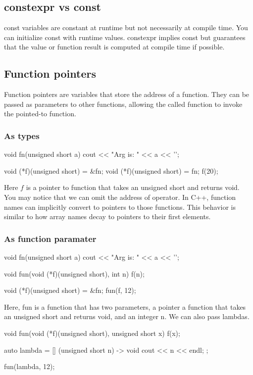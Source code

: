 \documentclass{report}
\begin{document}
   \bigbreak \noindent 
   \subsection{constexpr vs const}
   \bigbreak \noindent 
   const variables are constant at runtime but not necessarily at compile time. You can initialize const with runtime values.
   \bigbreak \noindent 
    constexpr implies const but guarantees that the value or function result is computed at compile time if possible.


    \pagebreak 
    \bigbreak \noindent 
    \subsection{Function pointers}
    \bigbreak \noindent 
    Function pointers are variables that store the address of a function. They can be passed as parameters to other functions, allowing the called function to invoke the pointed-to function.
    \bigbreak \noindent 
    \subsubsection{As types}
    \bigbreak \noindent 
    \begin{cppcode}
        void fn(unsigned short a) {
            cout << "Arg is: " << a << '\n';
        }

        void (*f)(unsigned short) = &fn;
        void (*f)(unsigned short) = fn;
        f(20);
    \end{cppcode}
    Here $f$ is a pointer to function that takes an unsigned short and returns void. You may notice that we can omit the address of operator. In C++, function names can implicitly convert to pointers to those functions. This behavior is similar to how array names decay to pointers to their first elements.
    \bigbreak \noindent 
    \bigbreak \noindent 
    \subsubsection{As function paramater}
    \begin{cppcode}
        void fn(unsigned short a) {
            cout << "Arg is: " << a << '\n';
        }

        void fun(void (*f)(unsigned short), int n) {
            f(n);
        }

        void (*f)(unsigned short) = &fn;
        fun(f, 12);
    \end{cppcode}
    \bigbreak \noindent 
    Here, fun is a function that has two parameters, a pointer a function that takes an unsigned short and returns void, and an integer n.
    \pagebreak \bigbreak \noindent 
    We can also pass lambdas.
    \bigbreak \noindent 
    \begin{cppcode}
        void fun(void (*f)(unsigned short), unsigned short x) {
            f(x);
        }

        auto lambda = [] (unsigned short n) -> void {
            cout << n << endl;
        };

        fun(lambda, 12);
    \end{cppcode}
\end{document}

